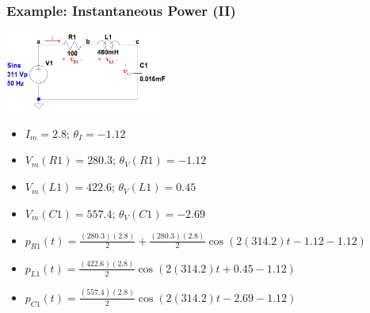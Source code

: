 \documentclass{beamer}
\begin{document}
\begin{frame}[fragile]
\begin{columns}[c]



\end{columns}


\end{frame}


\begin{frame}[fragile]
\frametitle{Example: Instantaneous Power (II)}

\vspace{-1cm}

\begin{flushright}
\includegraphics[width=0.4\textwidth]{src/Fig06a.png}
\end{flushright}

\vspace{-1cm}

\begin{itemize}
\item $I_m = 2.8$; $\theta_I = -1.12$
\item $V_m(R1) = 280.3$; $\theta_V(R1) = -1.12$
\item $V_m(L1) = 422.6$; $\theta_V(L1) = 0.45$
\item $V_m(C1) = 557.4$; $\theta_V(C1) = -2.69$
%
\item $p_{R1}(t) = \frac{(280.3)(2.8)}{2} + \frac{(280.3)(2.8)}{2} \cos( 2(314.2)t -1.12 - 1.12)$
\item $p_{L1}(t) = \frac{(422.6)(2.8)}{2} \cos( 2(314.2)t + 0.45 -1.12)$
\item $p_{C1}(t) = \frac{(557.4)(2.8)}{2} \cos( 2(314.2)t -2.69 -1.12)$
\end{itemize}


\end{frame}

\end{document}
